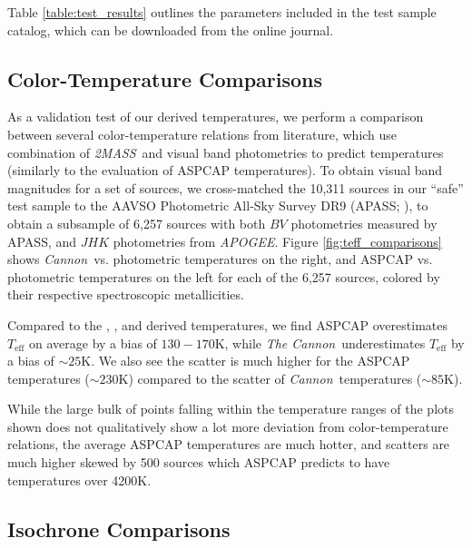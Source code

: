 \documentclass[twocolumn]{aastex62}
\newcommand{\apogee}{\textsl{APOGEE}}
\newcommand{\thecannon}{\textsl{The Cannon}}
\newcommand{\cannon}{\textsl{Cannon}}
\newcommand{\zmass}{\textsl{2MASS}}
\newcommand{\teff}{T_{\mathrm{eff}}}
\begin{document}
Table \ref{table:test_results} outlines the parameters included in the test sample catalog, which can be downloaded from the online journal.

\subsection{Color-Temperature Comparisons}

As a validation test of our derived temperatures, we perform a comparison between several color-temperature relations from literature, which use combination of \zmass\ and visual band photometries to predict temperatures (similarly to the \citealt{Schmidt:2016} evaluation of ASPCAP temperatures). To obtain visual band magnitudes for a set of sources, we cross-matched the 10,311 sources in our ``safe'' test sample to the AAVSO Photometric All-Sky Survey DR9 (APASS; \citealt{Henden:2016}), to obtain a subsample of 6,257 sources with both $BV$ photometries measured by APASS, and $JHK$ photometries from \apogee. Figure \ref{fig:teff_comparisons} shows \cannon\ vs. photometric temperatures on the right, and ASPCAP vs. photometric temperatures on the left for each of the 6,257 sources, colored by their respective spectroscopic metallicities.


Compared to the \citealt{Casagrande:2008}, \citealt{Boyajian:2012}, and \citealt{Mann:2015} derived temperatures, we find ASPCAP overestimates $\teff$ on average by a bias of $130-170$K, while \thecannon\ underestimates $\teff$ by a bias of $\sim25$K. We also see the scatter is much higher for the ASPCAP temperatures ($\sim230$K) compared to the scatter of \cannon\ temperatures ($\sim85$K).

While the large bulk of points falling within the temperature ranges of the plots shown does not qualitatively show a lot more deviation from color-temperature relations, the average ASPCAP temperatures are much hotter, and scatters are much higher skewed by 500 sources which ASPCAP predicts to have temperatures over 4200K.

\subsection{Isochrone Comparisons}
\end{document}
